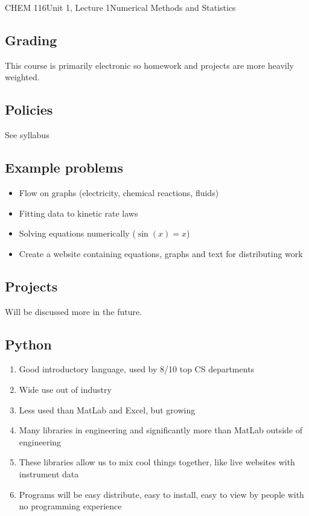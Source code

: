 \documentclass{article}
\begin{document}
\begin{tdoc}{CHEM 116}{Unit 1, Lecture 1}{Numerical Methods and Statistics}
\begin{description}
\end{description}

\subsection{Grading}

This course is primarily electronic so homework and projects are more
heavily weighted.

\subsection{Policies}
See syllabus

\subsection{Example problems}

\begin{itemize}

\item Flow on graphs (electricity, chemical reactions, fluids)
\item Fitting data to kinetic rate laws
\item Solving equations numerically ($\sin(x) = x$)
\item Create a website containing equations, graphs and text for distributing work

\end{itemize}

\subsection{Projects}

Will be discussed more in the future. 

\subsection{Python}

\begin{enumerate}

\item Good introductory language, used by 8/10 top CS departments
\item Wide use out of industry
\item Less used than MatLab and Excel, but growing
\item Many libraries in engineering and significantly more than MatLab outside of engineering
\item These libraries allow us to mix cool things together, like live websites with instrument data
\item Programs will be easy distribute, easy to install, easy to view by people with no programming experience


\end{enumerate}
\end{tdoc}
\end{document}

